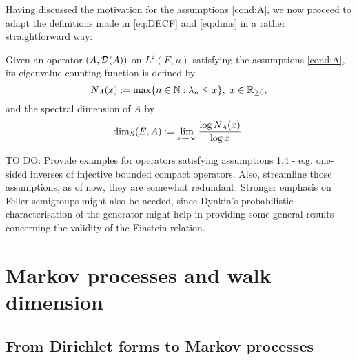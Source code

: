 Having discussed the motivation for the assumptions \ref{cond:A}, we now proceed to adapt the definitions made in \eqref{eq:DECF} and \eqref{eq:dims} in a rather straightforward way:
\begin{defin}
  Given an operator $(A,\mathcal{D}(A))$ on $L^2(E,\mu)$ satisfying the assumptions \ref{cond:A}, its eigenvalue counting function is defined by
  \begin{equation}\label{eq:defEVCF}
    N_A(x):=\max\{n\in\mathbb{N}:\lambda_n\leq x\},\ x\in\mathbb{R}_{\geq0},
  \end{equation}
  and the spectral dimension of $A$ by
  \begin{equation}\label{eq:defdims}
    \dim_{\mathcal{S}}(E,A):=\lim_{x\to\infty}\frac{\log N_A(x)}{\log x}.
  \end{equation}
\end{defin}

TO DO: Provide examples for operators satisfying assumptions 1.4 - e.g. one-sided inverses of injective bounded compact operators. Also, streamline those assumptions, as of now, they are somewhat redundant. Stronger emphasis on Feller semigroups might also be needed, since Dynkin's probabilistic characterisation of the generator \cite[Theorem 19.23]{kallenberg2002foundations} might help in providing some general results concerning the validity of the Einstein relation.


\section{Markov processes and walk dimension}

\subsection{From Dirichlet forms to Markov processes}


